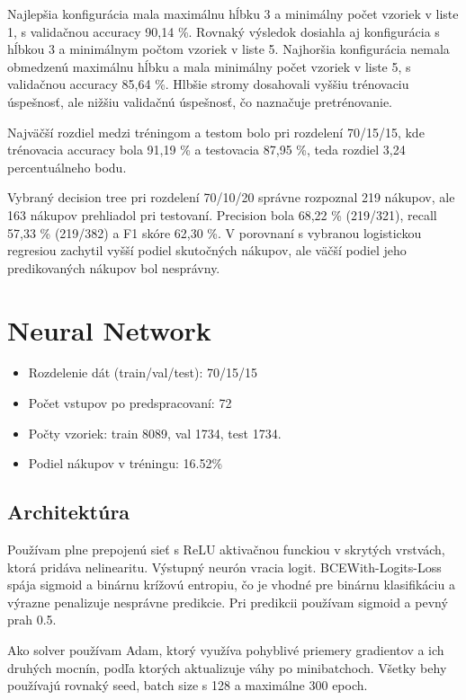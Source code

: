 \documentclass[a4paper,11pt]{article}
\begin{document}
Najlepšia konfigurácia mala maximálnu hĺbku 3 a minimálny počet vzoriek v liste 1, s validačnou accuracy 90,14 \%. Rovnaký výsledok dosiahla aj konfigurácia s hĺbkou 3 a minimálnym počtom vzoriek v liste 5. Najhoršia konfigurácia nemala obmedzenú maximálnu hĺbku a mala minimálny počet vzoriek v liste 5, s validačnou accuracy 85,64 \%. Hlbšie stromy dosahovali vyššiu trénovaciu úspešnosť, ale nižšiu validačnú úspešnosť, čo naznačuje pretrénovanie. 

Najväčší rozdiel medzi tréningom a testom bolo pri rozdelení 70/15/15, kde trénovacia accuracy bola 91,19 \% a testovacia 87,95 \%, teda rozdiel 3,24 percentuálneho bodu.

Vybraný decision tree pri rozdelení 70/10/20 správne rozpoznal 219 nákupov, ale 163 nákupov prehliadol pri testovaní. Precision bola 68,22 \% (219/321), recall 57,33 \% (219/382) a F1 skóre 62,30 \%. V porovnaní s vybranou logistickou regresiou zachytil vyšší podiel skutočných nákupov, ale väčší podiel jeho predikovaných nákupov bol nesprávny.


\section*{Neural Network}

\begin{itemize}
    \item Rozdelenie dát (train/val/test): 70/15/15
    \item Počet vstupov po predspracovaní: 72
    \item Počty vzoriek: train 8089, val 1734, test 1734.
    \item Podiel nákupov v tréningu: 16.52\%
\end{itemize}


\subsection*{Architektúra}

Používam plne prepojenú sieť s ReLU aktivačnou funckiou v skrytých vrstvách, ktorá pridáva nelinearitu. Výstupný neurón vracia logit. BCEWith-Logits-Loss spája sigmoid a binárnu krížovú entropiu, čo je vhodné pre binárnu klasifikáciu a výrazne penalizuje nesprávne predikcie. Pri predikcii používam sigmoid a pevný prah 0.5. 

Ako solver používam Adam, ktorý využíva pohyblivé priemery gradientov a ich druhých mocnín, podľa ktorých aktualizuje váhy po minibatchoch. Všetky behy používajú rovnaký seed, batch size s 128 a maximálne 300 epoch.
\end{document}
